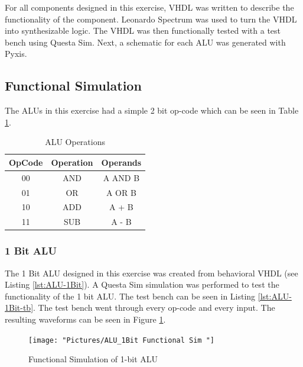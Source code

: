 \documentclass[11pt]{article}
\begin{document}
	For all components designed in this exercise, VHDL was written to describe the functionality of the component. Leonardo Spectrum was used to turn the VHDL into synthesizable logic. The VHDL was then functionally tested with a test bench using Questa Sim. Next, a schematic for each ALU was generated with Pyxis. 
	

	\subsection{Functional Simulation}
	
		The ALUs in this exercise had a simple 2 bit op-code which can be seen in Table \ref{tab:OpCodes}.
	
		\begin{table}[H]
			\centering
			\caption{ALU Operations}
			\label{tab:OpCodes}
			\begin{tabular}{|ccc|}
				\hline
				\textbf{OpCode} & \textbf{Operation} & \textbf{Operands} \\
				\hline
				00              & AND                & A AND B           \\
				01              & OR                 & A OR B            \\
				10              & ADD                & A + B             \\
				11              & SUB                & A - B   \\   
				\hline       
			\end{tabular}
		\end{table}
	
		\subsubsection{1 Bit ALU}
		
			The 1 Bit ALU designed in this exercise was created from behavioral VHDL (see Listing \ref{lst:ALU-1Bit}). A Questa Sim simulation was performed to test the functionality of the 1 bit ALU. The test bench can be seen in Listing \ref{lst:ALU-1Bit-tb}. The test bench went through every op-code and every input. The resulting waveforms can be seen in Figure \ref{fig:alu1bit-functional-sim-}.
		
			\begin{figure}[H]
				\centering
				\texttt{[image: "Pictures/ALU\_1Bit Functional Sim "]}
				\caption{Functional Simulation of 1-bit ALU}
				\label{fig:alu1bit-functional-sim-}
			\end{figure}
		
\end{document}
